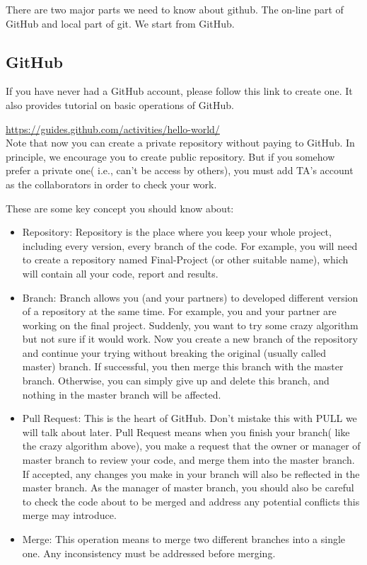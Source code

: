 \documentclass[12pt, fullpage,letterpaper]{article}
\begin{document}
There are two major parts we need to know about github. The on-line part of GitHub and local part of git. We start from GitHub.

\subsection*{GitHub}
If you have never had a GitHub account, please follow this link to create one. It also provides tutorial on basic operations of GitHub.


\href{https://guides.github.com/activities/hello-world/}{https://guides.github.com/activities/hello-world/}\\

Note that now you can create a private repository without paying to GitHub. In principle, we encourage you to create public repository. But if you somehow prefer a private one( i.e., can't be access by others), you must add TA's account as the collaborators in order to check your work.  

These are some key concept you should know about:
\begin{itemize}
	\item Repository: Repository is the place where you keep your whole project, including every version, every branch of the code. For example, you will need to create a repository named Final-Project (or other suitable name), which will contain all your code, report and results.
	
	\item Branch: Branch allows you (and your partners) to developed different version of a repository at the same time. For example, you and your partner are working on the final project. Suddenly, you want to try some crazy algorithm but not sure if it would work. Now you create a new branch of the repository and continue your trying without breaking the original (usually called master) branch. If successful, you then merge this branch with the master branch. Otherwise, you can simply give up and delete this branch, and nothing in the master branch will be affected. 
	
	\item Pull Request: This is the heart of GitHub. Don't mistake this with PULL we will talk about later. Pull Request means when you finish your branch( like the crazy algorithm above), you make a request that the owner or manager of master branch to review your code, and merge them into the master branch. If accepted, any changes you make in your branch will also be reflected in the master branch. As the manager of master branch, you should also be careful to check the code about to be merged and address any potential conflicts this merge may introduce. 
	
	\item Merge: This operation means to merge two different branches into a single one. Any inconsistency must be addressed before merging. 
\end{itemize}
\end{document}
